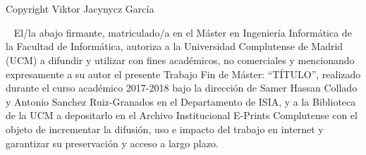 {\vfill %

\begin{large}
  \begin{center}
    \textoPrimerSubtituloPortadaVal\
\leavevmode \\\relax \mbox{ } \leavevmode \\\relax \mbox{ } \leavevmode \\\relax
\textoSegundoSubtituloPortadaVal \leavevmode \\[0.3em]
\end{center}
\end{large}

\vfill %

\begin{large}
\begin{center}
\textbf{\institucionVal}\leavevmode \\[0.2em]
    \mbox{ }  \leavevmode \\\relax
\textbf{\fechaPublicacionVal}
\end{center}
\end{large}


\newpage
\thispagestyle{empty}
\mbox{ }

\vskip 19cm
Copyright \textcopyright Viktor Jacynycz García

\newpage
\thispagestyle{empty}
\mbox{ }
\vskip 5cm
El/la abajo firmante, matriculado/a en el Máster en Ingeniería Informática de la
Facultad de Informática, autoriza a la Universidad Complutense de Madrid
(UCM) a difundir y utilizar con fines académicos, no comerciales y
mencionando expresamente a su autor el presente Trabajo Fin de Máster:
“TÍTULO”, realizado durante el curso académico 2017-2018 bajo la dirección
de Samer Hassan Collado y Antonio Sanchez Ruiz-Granados en el
Departamento de ISIA, y a la Biblioteca de la UCM a depositarlo en el
Archivo Institucional E-Prints Complutense con el objeto de incrementar la
difusión, uso e impacto del trabajo en internet y garantizar su preservación y
acceso a largo plazo.



}%

